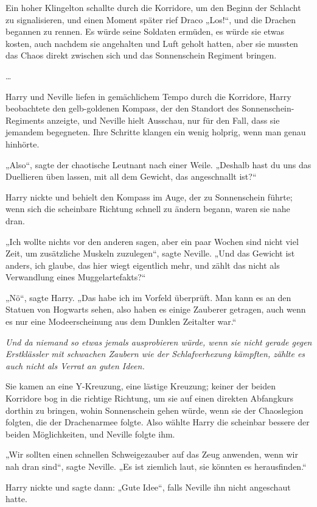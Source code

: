 {Ein hoher Klingelton schallte durch die Korridore, um den Beginn der Schlacht zu signalisieren, und einen Moment später rief Draco „Los!“, und die Drachen begannen zu rennen. Es würde seine Soldaten ermüden, es würde sie etwas kosten, auch nachdem sie angehalten und Luft geholt hatten, aber sie mussten das Chaos direkt zwischen sich und das Sonnenschein Regiment bringen.

…

Harry und Neville liefen in gemächlichem Tempo durch die Korridore, Harry beobachtete den gelb-goldenen Kompass, der den Standort des Sonnenschein-Regiments anzeigte, und Neville hielt Ausschau, nur für den Fall, dass sie jemandem begegneten. Ihre Schritte klangen ein wenig holprig, wenn man genau hinhörte.

„Also“, sagte der chaotische Leutnant nach einer Weile. „Deshalb hast du uns das Duellieren üben lassen, mit all dem Gewicht, das angeschnallt ist?“

Harry nickte und behielt den Kompass im Auge, der zu Sonnenschein führte; wenn sich die scheinbare Richtung schnell zu ändern begann, waren sie nahe dran.

„Ich wollte nichts vor den anderen sagen, aber ein paar Wochen sind nicht viel Zeit, um zusätzliche Muskeln zuzulegen“, sagte Neville. „Und das Gewicht ist anders, ich glaube, das hier wiegt eigentlich mehr, und zählt das nicht als Verwandlung eines Muggelartefakts?“

„Nö“, sagte Harry. „Das habe ich im Vorfeld überprüft. Man kann es an den Statuen von Hogwarts sehen, also haben es einige Zauberer getragen, auch wenn es nur eine Modeerscheinung aus dem Dunklen Zeitalter war.“

\emph{Und da niemand so etwas jemals ausprobieren würde, wenn sie nicht gerade gegen Erstklässler mit schwachen Zaubern wie der Schlafverhexung kämpften, zählte es auch nicht als Verrat an guten Ideen.}

Sie kamen an eine Y-Kreuzung, eine lästige Kreuzung; keiner der beiden Korridore bog in die richtige Richtung, um sie auf einen direkten Abfangkurs dorthin zu bringen, wohin Sonnenschein gehen würde, wenn sie der Chaoslegion folgten, die der Drachenarmee folgte. Also wählte Harry die scheinbar bessere der beiden Möglichkeiten, und Neville folgte ihm.

„Wir sollten einen schnellen Schweigezauber auf das Zeug anwenden, wenn wir nah dran sind“, sagte Neville. „Es ist ziemlich laut, sie könnten es herausfinden.“

Harry nickte und sagte dann: „Gute Idee“, falls Neville ihn nicht angeschaut hatte.

}
